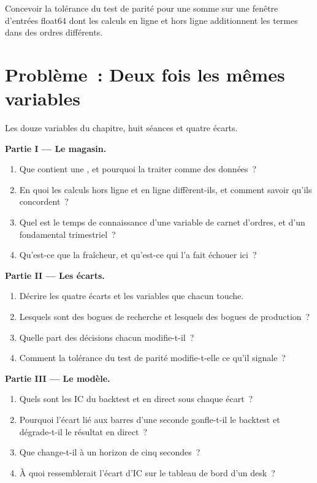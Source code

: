 \begin{exercise}[$\star\star\star$]\label{exo:ml:data-and-feature-stores:8}
Concevoir la tolérance du test de parité pour une somme sur une fenêtre d'entrées float64 dont les calculs en ligne et hors ligne
additionnent les termes dans des ordres différents.
\end{exercise}

\section{Problème~: Deux fois les mêmes variables}

\begin{problem}\label{pb:ml:data-and-feature-stores:1}
Les douze variables du chapitre, huit séances et quatre écarts.

\medskip\noindent\textbf{Partie I --- Le magasin.}
\begin{enumerate}
\item Que contient une , et pourquoi la traiter comme des données~?
\item En quoi les calculs hors ligne et en ligne diffèrent-ils, et comment savoir qu'ils concordent~?
\item Quel est le temps de connaissance d'une variable de carnet d'ordres, et d'un fondamental trimestriel~?
\item Qu'est-ce que la fraîcheur, et qu'est-ce qui l'a fait échouer ici~?
\end{enumerate}

\medskip\noindent\textbf{Partie II --- Les écarts.}
\begin{enumerate}[resume]
\item Décrire les quatre écarts et les variables que chacun touche.
\item Lesquels sont des bogues de recherche et lesquels des bogues de production~?
\item Quelle part des décisions chacun modifie-t-il~?
\item Comment la tolérance du test de parité modifie-t-elle ce qu'il signale~?
\end{enumerate}

\medskip\noindent\textbf{Partie III --- Le modèle.}
\begin{enumerate}[resume]
\item Quels sont les IC du backtest et en direct sous chaque écart~?
\item Pourquoi l'écart lié aux barres d'une seconde gonfle-t-il le backtest et dégrade-t-il le résultat en direct~?
\item Que change-t-il à un horizon de cinq secondes~?
\item À quoi ressemblerait l'écart d'IC sur le tableau de bord d'un desk~?
\end{enumerate}


\end{problem}

